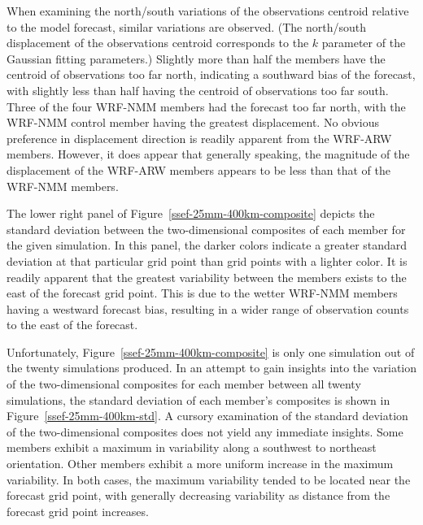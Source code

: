 When examining the north/south variations of the observations centroid relative to the model forecast, similar variations are observed.
(The north/south displacement of the observations centroid corresponds to the $k$ parameter of the Gaussian fitting parameters.)
Slightly more than half the members have the centroid of observations too far north, indicating a southward bias of the forecast, with slightly less than half having the centroid of observations too far south.
Three of the four WRF-NMM members had the forecast too far north, with the WRF-NMM control member having the greatest displacement.
No obvious preference in displacement direction is readily apparent from the WRF-ARW members.
However, it does appear that generally speaking, the magnitude of the displacement of the WRF-ARW members appears to be less than that of the WRF-NMM members.


The lower right panel of \mbox{Figure \ref{ssef-25mm-400km-composite}} depicts the standard deviation between the two-dimensional composites of each member for the given simulation.
In this panel, the darker colors indicate a greater standard deviation at that particular grid point than grid points with a lighter color.
It is readily apparent that the greatest variability between the members exists to the east of the forecast grid point.
This is due to the wetter WRF-NMM members having a westward forecast bias, resulting in a wider range of observation counts to the east of the forecast.


Unfortunately, \mbox{Figure \ref{ssef-25mm-400km-composite}} is only one simulation out of the twenty simulations produced.
In an attempt to gain insights into the variation of the two-dimensional composites for each member between all twenty simulations, the standard deviation of each member's composites is shown in \mbox{Figure \ref{ssef-25mm-400km-std}}.
A cursory examination of the standard deviation of the two-dimensional composites does not yield any immediate insights.
Some members exhibit a maximum in variability along a southwest to northeast orientation.
Other members exhibit a more uniform increase in the maximum variability.
In both cases, the maximum variability tended to be located near the forecast grid point, with generally decreasing variability as distance from the forecast grid point increases.


